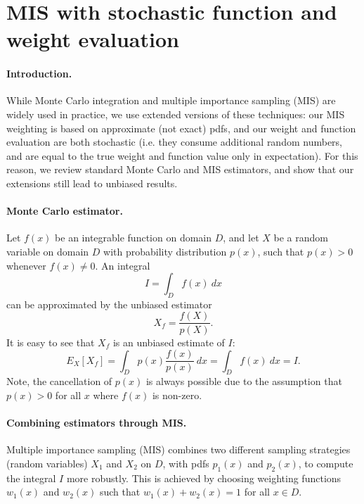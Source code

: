 \section{MIS with stochastic function and weight evaluation}
\label{sec:layeredbsdf:weight_evaluation}

\paragraph{Introduction.}

While Monte	Carlo integration and multiple importance sampling (MIS) are widely used in practice, we use extended versions of these techniques: our MIS weighting is based on approximate (not exact) pdfs, and our weight and function evaluation are both stochastic (i.e. they consume additional random numbers, and are  equal to the true weight and function value only in expectation). For this reason, we review standard Monte Carlo and MIS estimators, and show that our extensions still lead to unbiased results.


\paragraph{Monte Carlo estimator.}

Let $f(x)$ be an integrable function on domain $D$, and let $X$ be a random variable on domain $D$ with probability distribution $p(x)$, such that $p(x) > 0$ whenever $f(x) \neq 0$. An integral
\begin{equation}
I = \int_D f(x) \ dx
\end{equation}
can be approximated by the unbiased estimator
\begin{equation}
X_f = \frac{f(X)}{p(X)}.
\end{equation}
It is easy to see that $X_f$ is an unbiased estimate of $I$:
\begin{equation}
E_X[X_f] = \int_D p(x) \frac{f(x)}{p(x)} \ dx = \int_D f(x) \ dx = I.
\end{equation}
Note, the cancellation of $p(x)$ is always possible due to the assumption that $p(x) > 0$ for all $x$ where $f(x)$ is non-zero.


\paragraph{Combining estimators through MIS.}

Multiple importance sampling (MIS) combines two different sampling strategies (random variables) $X_1$ and $X_2$ on $D$, with pdfs $p_1(x)$ and $p_2(x)$, to compute the integral $I$ more robustly. This is achieved by choosing weighting functions $w_1(x)$ and $w_2(x)$ such that $w_1(x) + w_2(x) = 1$ for all $x \in D$.

